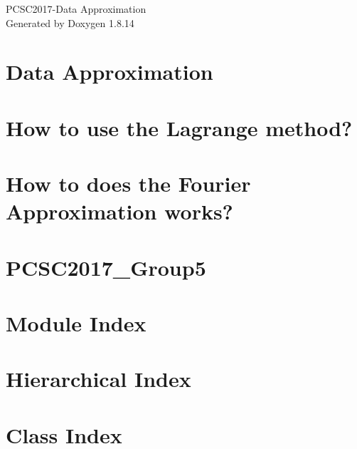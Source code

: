 \documentclass[twoside]{book}
\newcommand{\+}{\discretionary{\mbox{\scriptsize$\hookleftarrow$}}{}{}}
\newcommand{\clearemptydoublepage}{%
  \newpage{\pagestyle{empty}\cleardoublepage}%
}
\begin{document}
\hypersetup{pageanchor=false,
             bookmarksnumbered=true,
             pdfencoding=unicode
            }
\begin{titlepage}
\vspace*{7cm}
\begin{center}%
{\Large P\+C\+S\+C2017-\/\+Data Approximation }\\
\vspace*{1cm}
{\large Generated by Doxygen 1.8.14}\\
\end{center}
\end{titlepage}
\clearemptydoublepage
{}
\tableofcontents
\clearemptydoublepage
{}
\hypersetup{pageanchor=true}

\chapter{Data Approximation}
\label{index}\hypertarget{index}{}
\chapter{How to use the Lagrange method?}
\label{_lagrange_polynomial}

\chapter{How to does the Fourier Approximation works?}
\label{_fourier_transforms}

\chapter{P\+C\+S\+C2017\+\_\+\+Group5}
\label{md___users_davidcleres__c_lion_projects__p_c_s_c2017__group5__r_e_a_d_m_e}

\chapter{Module Index}

\chapter{Hierarchical Index}

\chapter{Class Index}

\end{document}
